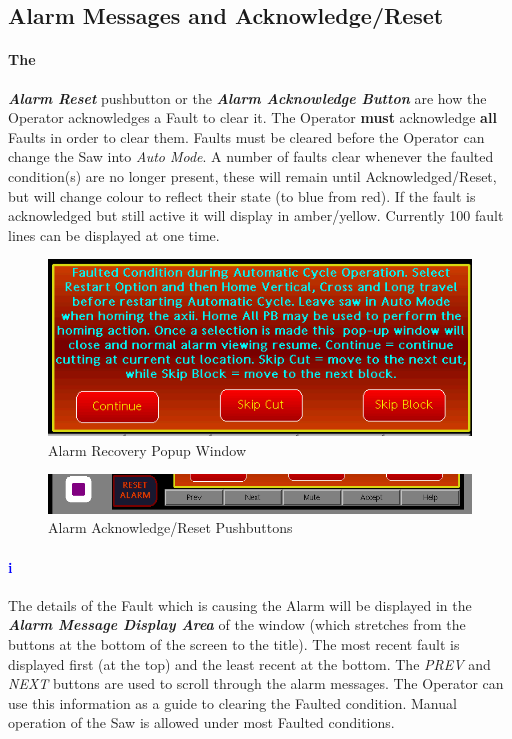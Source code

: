 \subsection{Alarm Messages and Acknowledge/Reset} \paragraph*{The}\textbf{\textit{Alarm Reset}} pushbutton or the \textbf{\textit{Alarm Acknowledge Button}} are how the Operator acknowledges a Fault to clear it. The Operator \textbf{must} acknowledge \textbf{all} Faults in order to clear them. Faults must be cleared before the Operator can change the Saw into \textit{Auto Mode}. A number of faults clear whenever the faulted condition(s) are no longer present, these will remain until Acknowledged/Reset, but will change colour to reflect their state (to blue from red). If the fault is acknowledged but still active it will display in amber/yellow. Currently 100 fault lines can be displayed at one time. 
\begin{figure}
	\centering
	\includegraphics[width=.5\linewidth]{screen-captures/alarms/alarms-recovery}
	\caption{Alarm Recovery Popup Window}
	\label{fig:alarm-recovery}
\end{figure}
\begin{figure}
	\centering
	\includegraphics[width=.3\linewidth]{screen-captures/alarms/alarms-reset}
	\caption{Alarm Acknowledge/Reset Pushbuttons}
	\label{fig:alarm-reset}
\end{figure}
\paragraph*{\textbf{\LARGE \textcolor{blue}{i}}}The details of the Fault which is causing the Alarm will be displayed in the \textbf{\textit{Alarm Message Display Area}} of the window (which stretches from the buttons at the bottom of the screen to the title). The most recent fault is displayed first (at the top) and the least recent at the bottom. The \textit{PREV} and \textit{NEXT} buttons are used to scroll through the alarm messages. The Operator can use this information as a guide to clearing the Faulted condition. Manual operation of the Saw is allowed under most Faulted conditions.
